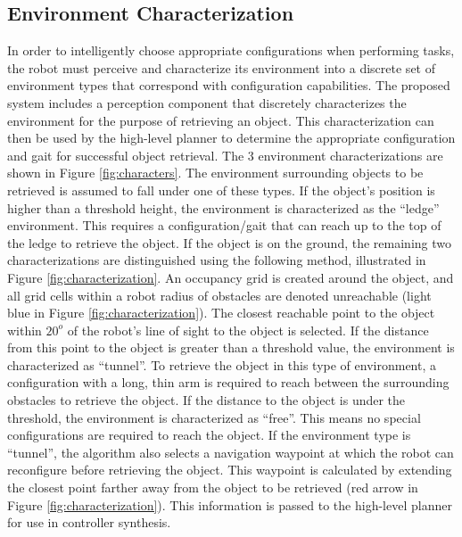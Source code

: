 \documentclass[conference]{IEEEtran}
\begin{document}
\subsection{Environment Characterization}
\label{sec:environment-characterization}
%
In order to intelligently choose appropriate configurations when performing tasks, the robot must perceive and characterize its environment into a discrete set of environment types that correspond with configuration capabilities. The proposed system includes a perception component that discretely characterizes the environment for the purpose of retrieving an object. This characterization can then be used by the high-level planner to determine the appropriate configuration and gait for successful object retrieval. The 3 environment characterizations are shown in Figure \ref{fig:characters}. The environment surrounding objects to be retrieved is assumed to fall under one of these types. If the object's position is higher than a threshold height, the environment is characterized as the ``ledge'' environment. This requires a configuration/gait that can reach up to the top of the ledge to retrieve the object. If the object is on the ground, the remaining two characterizations are distinguished using the following method, illustrated in Figure \ref{fig:characterization}. An occupancy grid is created around the object, and all grid cells within a robot radius of obstacles are denoted unreachable (light blue in Figure \ref{fig:characterization}). The closest reachable point to the object within $20^o$ of the robot's line of sight to the object is selected. If the distance from this point to the object is greater than a threshold value, the environment is characterized as ``tunnel''. To retrieve the object in this type of environment, a configuration with a long, thin arm is required to reach between the surrounding obstacles to retrieve the object. If the distance to the object is under the threshold, the environment is characterized as ``free''. This means no special configurations are required to reach the object. If the environment type is ``tunnel'', the algorithm also selects a navigation waypoint at which the robot can reconfigure before retrieving the object. This waypoint is calculated by extending the closest point farther away from the object to be retrieved (red arrow in Figure \ref{fig:characterization}). This information is passed to the high-level planner for use in controller synthesis.
\end{document}
